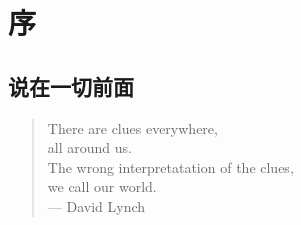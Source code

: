 \chapter{序}

\section{说在一切前面}

\begin{quotation}
There are clues everywhere,\\
\quad all around us.\\
\quad \quad The wrong interpretatation of the clues,\\
\quad \quad \quad we call our world.\\
\quad \quad \quad \quad ---  David Lynch
\end{quotation}
